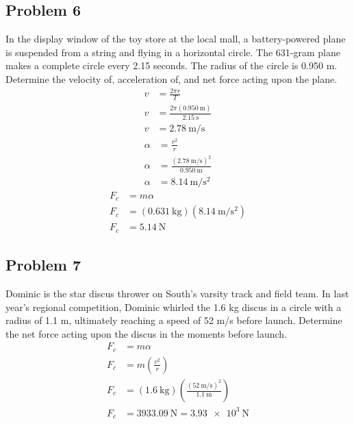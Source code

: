\documentclass{article}
\begin{document}
\subsection{Problem 6}

In the display window of the toy store at the local mall, a battery-powered plane is suspended from a string and flying in a horizontal circle. The 631-gram plane makes a complete circle every 2.15 seconds. The radius of the circle is 0.950 m. Determine the velocity of, acceleration of, and net force acting upon the plane.
\begin{align*}
	v & = \frac{ 2\pi r }{ T } \\
	v & = \frac{ 2\pi (\SI{0.950}{\meter}) }{ \SI{2.15}{\second} } \\
	v & = \SI{2.78}{\meter \per \second}
\end{align*}
\begin{align*}
	\alpha & = \frac{ v^2 }{ r } \\
	\alpha & = \frac{ (\SI{2.78}{\meter \per \second})^2 }{ \SI{0.950}{\meter} } \\
	\alpha & = \SI{8.14}{\meter \per \second \squared}
\end{align*}
\begin{align*}
	F_c & = m\alpha \\
	F_c & = (\SI{0.631}{\kilogram})(\SI{8.14}{\meter \per \second \squared}) \\
	F_c & = \SI{5.14}{\newton}
\end{align*}

\subsection{Problem 7}

Dominic is the star discus thrower on South's varsity track and field team. In last year's regional competition, Dominic whirled the 1.6 kg discus in a circle with a radius of 1.1 m, ultimately reaching a speed of 52 m/s before launch. Determine the net force acting upon the discus in the moments before launch.
\begin{align*}
	F_c & = m\alpha \\
	F_c & = m \left( \frac{ v^2 }{ r } \right) \\
	F_c & = (\SI{1.6}{\kilogram}) \left( \frac{ (\SI{52}{\meter \per \second})^2 }{ \SI{1.1}{\meter} } \right) \\
	F_c & = \SI{3933.09}{\newton} = \SI{3.93e3}{\newton}
\end{align*}
\end{document}
